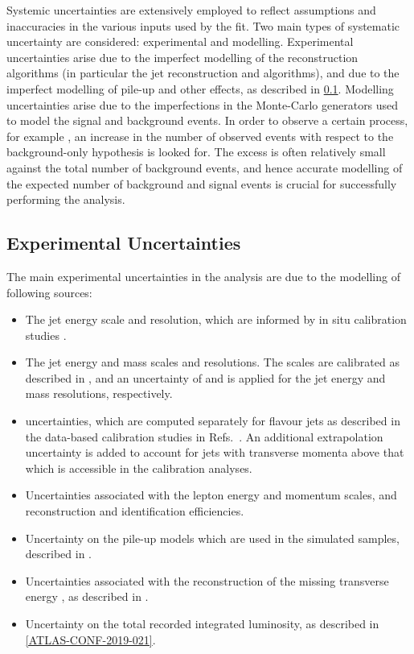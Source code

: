 Systemic uncertainties are extensively employed to reflect assumptions and inaccuracies in the various inputs used by the fit.
Two main types of systematic uncertainty are considered: experimental and modelling.
Experimental uncertainties arise due to the imperfect modelling of the reconstruction algorithms (in particular the jet reconstruction and \btagging algorithms), and due to the imperfect modelling of pile-up and other effects, as described in \cref{sec:experimental_uncertainties}.
Modelling uncertainties arise due to the imperfections in the Monte-Carlo generators used to model the signal and background events.
In order to observe a certain process, for example \VHbb, an increase in the number of observed events with respect to the background-only hypothesis is looked for.
The excess is often relatively small against the total number of background events, and hence accurate modelling of the expected number of background and signal events is crucial for successfully performing the analysis.


\subsection{Experimental Uncertainties}\label{sec:experimental_uncertainties}

The main experimental uncertainties in the analysis are due to the modelling of following sources:

\begin{itemize}
  \item The \smallR jet energy scale and resolution, which are informed by in situ calibration studies \cite{PERF-2016-04}.
  \item The \largeR jet energy and mass scales and resolutions. The scales are calibrated as described in , and an uncertainty of  and  is applied for the jet energy and mass resolutions, respectively.
  \item \btagging uncertainties, which are computed separately for \bcl flavour jets as described in the data-based calibration studies in Refs.~\cite{PERF-2016-05,ATLAS-CONF-2018-006,ATLAS-CONF-2018-001}. An additional extrapolation uncertainty is added to account for jets with transverse momenta above that which is accessible in the calibration analyses.
  \item Uncertainties associated with the lepton energy and momentum scales, and reconstruction and identification efficiencies.
  \item Uncertainty on the pile-up models which are used in the simulated samples, described in .
  \item Uncertainties associated with the reconstruction of the missing transverse energy \ETmiss, as described in .
  \item Uncertainty on the total recorded integrated luminosity, as described in \cref{ATLAS-CONF-2019-021}.
\end{itemize}

